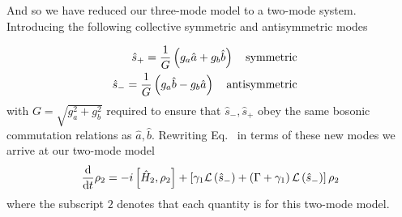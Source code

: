 And so we have reduced our three-mode model to a two-mode system. Introducing the following collective symmetric and antisymmetric modes

\begin{align}
\hat{s}_+ = \frac{1}{G} \left(g_a \hat{a} + g_b \hat{b}\right) \qq{symmetric}  \notag \\
%
\hat{s}_- = \frac{1}{G} \left(g_a \hat{b} - g_b \hat{a}\right) \qq{antisymmetric}
\end{align}
with $G = \sqrt{ g_a^2 + g_b^2 }$ required to ensure that $\hat{s}_-, \hat{s}_+$ obey the same bosonic commutation relations as $\hat{a}, \hat{b}$. Rewriting Eq.~ in terms of these new modes we arrive at our two-mode model
\begin{equation}\label{eqn:phog_lindblad_two_mode_model}
\frac{\mathrm{d}}{\mathrm{d}t} \rho_2 = - i \left[ \hat{H}_2, \rho_2 \right] + \left[ \gamma_1 \mathcal{L}\left(\hat{s}_-\right) + \left(\Gamma + \gamma_1\right) \mathcal{L}\left(\hat{s}_-\right) \right] \rho_2
\end{equation}
where the subscript $2$ denotes that each quantity is for this two-mode model.











